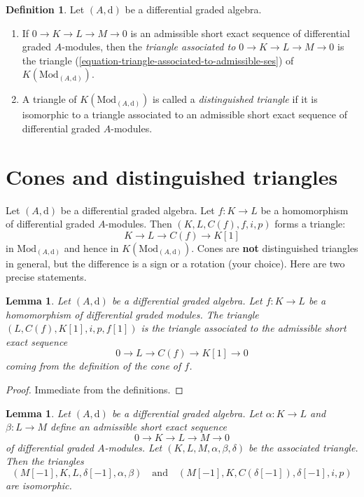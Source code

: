 \documentclass{stacks-project}
\theoremstyle{plain}
\newtheorem{lemma}[subsection]{Lemma}
\theoremstyle{definition}
\newtheorem{definition}[subsection]{Definition}
\theoremstyle{remark}
\numberwithin{equation}{subsection}
\begin{document}
\begin{definition}
\label{definition-distinguished-triangle}
Let $(A, \text{d})$ be a differential graded algebra.
\begin{enumerate}
\item If $0 \to K \to L \to M \to 0$ is an admissible short exact sequence
of differential graded $A$-modules, then the {\it triangle associated
to $0 \to K \to L \to M \to 0$} is the triangle 
(\ref{equation-triangle-associated-to-admissible-ses})
of $K(\text{Mod}_{(A, \text{d})})$.
\item A triangle of $K(\text{Mod}_{(A, \text{d})})$ is called a
{\it distinguished triangle} if it is isomorphic to a triangle
associated to an admissible short exact sequence
of differential graded $A$-modules.
\end{enumerate}
\end{definition}









\section{Cones and distinguished triangles}
\label{section-cones-and-triangles}

\noindent
Let $(A, \text{d})$ be a differential graded algebra.
Let $f : K \to L$ be a homomorphism of differential graded $A$-modules.
Then $(K, L, C(f), f, i, p)$ forms a triangle:
$$
K \to L \to C(f) \to K[1]
$$
in $\text{Mod}_{(A, \text{d})}$ and hence in $K(\text{Mod}_{(A, \text{d})})$.
Cones are {\bf not} distinguished triangles in general, but the difference
is a sign or a rotation (your choice). Here are two precise statements.

\begin{lemma}
\label{lemma-rotate-cone}
Let $(A, \text{d})$ be a differential graded algebra.
Let $f : K \to L$ be a homomorphism of differential graded modules.
The triangle $(L, C(f), K[1], i, p, f[1])$ is
the triangle associated to the admissible short exact sequence
$$
0 \to L \to C(f) \to K[1] \to 0
$$
coming from the definition of the cone of $f$.
\end{lemma}

\begin{proof}
Immediate from the definitions.
\end{proof}

\begin{lemma}
\label{lemma-rotate-triangle}
Let $(A, \text{d})$ be a differential graded algebra.
Let $\alpha : K \to L$ and $\beta : L \to M$
define an admissible short exact sequence
$$
0 \to K \to L \to M \to 0
$$
of differential graded $A$-modules.
Let $(K, L, M, \alpha, \beta, \delta)$
be the associated triangle. Then the triangles
$$
(M[-1], K, L, \delta[-1], \alpha, \beta)
\quad\text{and}\quad
(M[-1], K, C(\delta[-1]), \delta[-1], i, p)
$$
are isomorphic.
\end{lemma}
\end{document}
